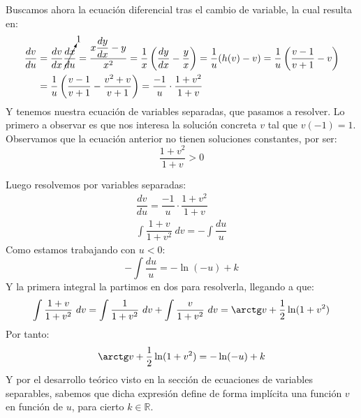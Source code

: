 \begin{ejemplo}
\noindent
Buscamos ahora la ecuación diferencial tras el cambio de variable, la cual resulta en:
\begin{align*}
    \dfrac{dv}{du} &= \dfrac{dv}{dx} \cancelto{1}{\dfrac{dx}{du}} = \dfrac{x\dfrac{dy}{dx}-y}{x^2} = \dfrac{1}{x} \left( \dfrac{dy}{dx} - \dfrac{y}{x} \right) = \dfrac{1}{u}(h(v)-v) = \dfrac{1}{u}\left(\dfrac{v-1}{v+1}-v\right) \\
                   &= \dfrac{1}{u}\left(\dfrac{v-1}{v+1}-\dfrac{v^2+v}{v+1}\right) = \dfrac{-1}{u}\cdot \dfrac{1+v^2}{1+v}
\end{align*}
Y tenemos nuestra ecuación de variables separadas, que pasamos a resolver. Lo primero a observar es que nos interesa la solución concreta $v$ tal que $v(-1)=1$.\\

 Observamos que la ecuación anterior no tienen soluciones constantes, por ser:
 \begin{equation*}
     \dfrac{1+v^2}{1+v} > 0
 \end{equation*}

 Luego resolvemos por variables separadas:
 \begin{gather*}
     \dfrac{dv}{du} = \dfrac{-1}{u}\cdot \dfrac{1+v^2}{1+v} \\
     \int \dfrac{1+v}{1+v^2}~dv = -\int \dfrac{du}{u}
 \end{gather*}
 Como estamos trabajando con $u<0$:
 \begin{equation*}
     -\int \dfrac{du}{u}= -\ln(-u) + k
 \end{equation*}
 Y la primera integral la partimos en dos para resolverla, llegando a que:
 \begin{equation*}
     \int \dfrac{1+v}{1+v^2}~dv = \int \dfrac{1}{1+v^2}~dv + \int \dfrac{v}{1+v^2}~dv   = \arctg v +\dfrac{1}{2}\ln(1+v^2)
 \end{equation*}
 Por tanto:
 \begin{equation*}
     \arctg v + \dfrac{1}{2}\ln(1+v^2) = -\ln(-u) + k
 \end{equation*}
 Y por el desarrollo teórico visto en la sección de ecuaciones de variables separables, sabemos que dicha expresión define de forma implícita una función $v$ en función de $u$, para cierto $k\in \mathbb{R}$.


\end{ejemplo}
